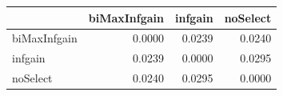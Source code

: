 \begin{tabular}{lrrr}
\toprule
 & biMaxInfgain & infgain & noSelect \\
\midrule
biMaxInfgain & 0.0000 & 0.0239 & 0.0240 \\
infgain & 0.0239 & 0.0000 & 0.0295 \\
noSelect & 0.0240 & 0.0295 & 0.0000 \\
\bottomrule
\end{tabular}
